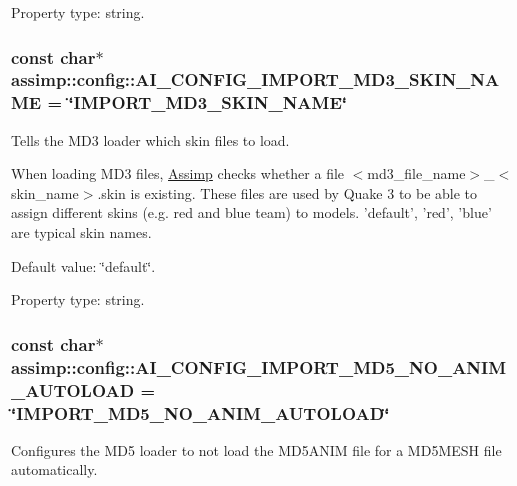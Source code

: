 Property type\+: string. \hypertarget{namespaceassimp_1_1config_ae971a2b82c314b6080093510f05127c0}{
\subsubsection[{A\+I\+\_\+\+C\+O\+N\+F\+I\+G\+\_\+\+I\+M\+P\+O\+R\+T\+\_\+\+M\+D3\+\_\+\+S\+K\+I\+N\+\_\+\+N\+A\+M\+E}]{\setlength{\rightskip}{0pt plus 5cm}const char$\ast$ assimp\+::config\+::\+A\+I\+\_\+\+C\+O\+N\+F\+I\+G\+\_\+\+I\+M\+P\+O\+R\+T\+\_\+\+M\+D3\+\_\+\+S\+K\+I\+N\+\_\+\+N\+A\+M\+E = \char`\"{}I\+M\+P\+O\+R\+T\+\_\+\+M\+D3\+\_\+\+S\+K\+I\+N\+\_\+\+N\+A\+M\+E\char`\"{}}}\label{namespaceassimp_1_1config_ae971a2b82c314b6080093510f05127c0}
Tells the M\+D3 loader which skin files to load.

When loading M\+D3 files, \hyperlink{class_assimp}{Assimp} checks whether a file {\ttfamily $<$md3\+\_\+file\+\_\+name$>$\+\_\+$<$skin\+\_\+name$>$.\+skin} is existing. These files are used by Quake 3 to be able to assign different skins (e.\+g. red and blue team) to models. 'default', 'red', 'blue' are typical skin names.

Default value\+: \char`\"{}default\char`\"{}.

Property type\+: string. \hypertarget{namespaceassimp_1_1config_a2194512ebb20be6f70d5a20632868aa7}{
\subsubsection[{A\+I\+\_\+\+C\+O\+N\+F\+I\+G\+\_\+\+I\+M\+P\+O\+R\+T\+\_\+\+M\+D5\+\_\+\+N\+O\+\_\+\+A\+N\+I\+M\+\_\+\+A\+U\+T\+O\+L\+O\+A\+D}]{\setlength{\rightskip}{0pt plus 5cm}const char$\ast$ assimp\+::config\+::\+A\+I\+\_\+\+C\+O\+N\+F\+I\+G\+\_\+\+I\+M\+P\+O\+R\+T\+\_\+\+M\+D5\+\_\+\+N\+O\+\_\+\+A\+N\+I\+M\+\_\+\+A\+U\+T\+O\+L\+O\+A\+D = \char`\"{}I\+M\+P\+O\+R\+T\+\_\+\+M\+D5\+\_\+\+N\+O\+\_\+\+A\+N\+I\+M\+\_\+\+A\+U\+T\+O\+L\+O\+A\+D\char`\"{}}}\label{namespaceassimp_1_1config_a2194512ebb20be6f70d5a20632868aa7}
Configures the M\+D5 loader to not load the M\+D5\+A\+N\+I\+M file for a M\+D5\+M\+E\+S\+H file automatically.

